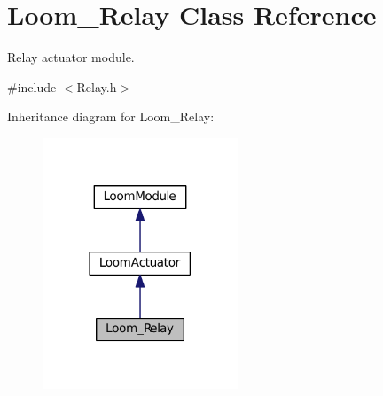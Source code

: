\hypertarget{class_loom___relay}{}\section{Loom\+\_\+\+Relay Class Reference}
\label{class_loom___relay}


Relay actuator module.  




{\ttfamily \#include $<$Relay.\+h$>$}



Inheritance diagram for Loom\+\_\+\+Relay\+:\nopagebreak
\begin{figure}[H]
\begin{center}
\leavevmode
\includegraphics[width=165pt]{class_loom___relay__inherit__graph}
\end{center}
\end{figure}
